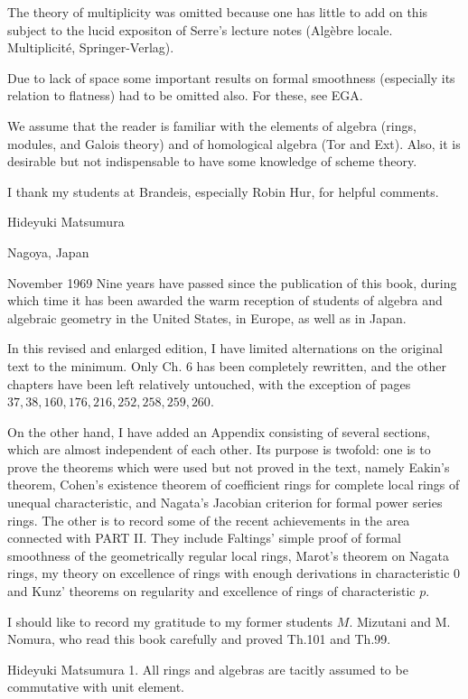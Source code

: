 The theory of multiplicity was omitted because one has little to add on this subject to the lucid expositon of Serre's lecture notes (Algèbre locale. Multiplicité, Springer-Verlag).

Due to lack of space some important results on formal smoothness (especially its relation to flatness) had to be omitted also. For these, see EGA.

We assume that the reader is familiar with the elements of algebra (rings, modules, and Galois theory) and of homological algebra (Tor and Ext). Also, it is desirable but not indispensable to have some knowledge of scheme theory.

I thank my students at Brandeis, especially Robin Hur, for helpful comments.

Hideyuki Matsumura

Nagoya, Japan

November 1969 Nine years have passed since the publication of this book, during which time it has been awarded the warm reception of students of algebra and algebraic geometry in the United States, in Europe, as well as in Japan.

In this revised and enlarged edition, I have limited alternations on the original text to the minimum. Only Ch. 6 has been completely rewritten, and the other chapters have been left relatively untouched, with the exception of pages $37,38,160,176,216,252,258,259,260$.

On the other hand, I have added an Appendix consisting of several sections, which are almost independent of each other. Its purpose is twofold: one is to prove the theorems which were used but not proved in the text, namely Eakin's theorem, Cohen's existence theorem of coefficient rings for complete local rings of unequal characteristic, and Nagata's Jacobian criterion for formal power series rings. The other is to record some of the recent achievements in the area connected with PART II. They include Faltings' simple proof of formal smoothness of the geometrically regular local rings, Marot's theorem on Nagata rings, my theory on excellence of rings with enough derivations in characteristic 0 and Kunz' theorems on regularity and excellence of rings of characteristic $p$.

I should like to record my gratitude to my former students $M$. Mizutani and M. Nomura, who read this book carefully and proved Th.101 and Th.99.

Hideyuki Matsumura 1. All rings and algebras are tacitly assumed to be commutative with unit element.

